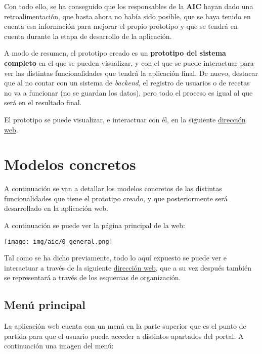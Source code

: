 \documentclass{\ClassPath/viu-tfm-template}
\begin{document}
Con todo ello, se ha conseguido que los responsables de la \textbf{AIC} hayan dado una retroalimentación, que hasta ahora no había sido posible, que se haya tenido en cuenta esa información para mejorar el propio prototipo y que se tendrá en cuenta durante la etapa de desarrollo de la aplicación.

A modo de resumen, el prototipo creado es un \textbf{prototipo del sistema completo} en el que se pueden visualizar, y con el que se puede interactuar para ver las distintas funcionalidades que tendrá la aplicación final. De nuevo, destacar que al no contar con un sistema de \textit{backend}, el registro de usuarios o de recetas no va a funcionar (no se guardan los datos), pero todo el proceso es igual al que será en el resultado final.

El prototipo se puede visualizar, e interactuar con él, en la siguiente  \href{https://yuki.github.io/VIU_03MASW/preview.html}{dirección web}.


\chapter{Modelos concretos}

A continuación se van a detallar los modelos concretos de las distintas funcionalidades que tiene el prototipo creado, y que posteriormente será desarrollado en la aplicación web.

A continuación se puede ver la página principal de la web:

\begin{center}
    \vspace{-10pt}
    \texttt{[image: img/aic/0\_general.png]}
    \vspace{-20pt}
\end{center}

Tal como se ha dicho previamente, todo lo aquí expuesto se puede ver e interactuar a través de la siguiente \href{https://yuki.github.io/VIU_03MASW/preview.html}{dirección web}, que a su vez después también se representará a través de los esquemas de organización.

\hypertarget{menu_principal}{}
\section{Menú principal}

La aplicación web cuenta con un menú en la parte superior que es el punto de partida para que el usuario pueda acceder a distintos apartados del portal. A continuación una imagen del menú:
\end{document}
